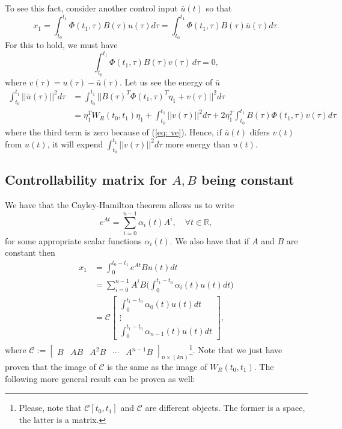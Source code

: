 To see this fact, consider another control input $\bar u(t)$ so that
\begin{equation}
x_1 = \int_{t_0}^{t_1} \Phi(t_1,\tau)B(\tau)u(\tau)d\tau = \int_{t_0}^{t_1} \Phi(t_1,\tau)B(\tau)\bar u(\tau)d\tau.
\end{equation}
For this to hold, we must have
\begin{equation}
	\int_{t_0}^{t_1} \Phi(t_1,\tau)B(\tau)v(\tau) \, d\tau = 0,
	\label{eq: ve}
\end{equation}
where $v(\tau) = u(\tau) - \bar u(\tau)$.
Let us see the energy of $\bar u$
\begin{align}
\int_{t_0}^{t_1}||\bar u(\tau)||^2 d\tau &= \int_{t_0}^{t_1} || B(\tau)^T\Phi(t_1,\tau)^T \eta_1 + v(\tau)||^2 d\tau \nonumber \\ 
&= \eta_1^T W_R(t_0,t_1)\eta_1 + \int_{t_0}^{t_1} ||v(\tau)||^2 d \tau + 2\eta_1^T \int_{t_0}^{t_1}B(\tau)\Phi(t_1,\tau)v(\tau) d \tau
\end{align}
where the third term is zero because of (\ref{eq: ve}). Hence, if $\bar u(t)$ difers $v(t)$ from $u(t)$, it will expend $\int_{t_0}^{t_1} ||v(\tau)||^2 d\tau$ more energy than $u(t)$.

\subsection{Controllability matrix for $A,B$ being constant}

We have that the Cayley-Hamilton theorem allows us to write
\begin{equation}
	e^{At} = \sum_{i=0}^{n-1}\alpha_i(t)A^i, \quad \forall t\in\mathbb{R},
\end{equation}
for some appropriate scalar functions $\alpha_i(t)$. We also have that if $A$ and $B$ are constant then
\begin{align}
	x_1 &= \int_{0}^{t_0-t_1} e^{At}Bu(t) dt \nonumber \\
	&= \sum_{i=0}^{n-1} A^iB \Big(\int_{0}^{t_1-t_0}\alpha_i(t)u(t)dt \Big) \nonumber \\
	&= \mathcal{C} \begin{bmatrix}\int_{0}^{t_1-t_0}\alpha_0(t)u(t)dt \\ \vdots \\ \int_{0}^{t_1-t_0} \alpha_{n-1}(t)u(t)dt \end{bmatrix},
\end{align}
where $\mathcal{C}:=\begin{bmatrix}B & AB & A^2B & \cdots & A^{n-1}B
\end{bmatrix}_{n\times (kn)}$\footnote{Please, note that $\mathcal{C}[t_0,t_1]$ and $\mathcal{C}$ are different objects. The former is a space, the latter is a matrix.}.
Note that we just have proven that the image of $\mathcal{C}$ is the same as the image of $W_R(t_0,t_1)$. The following more general result can be proven as well:


